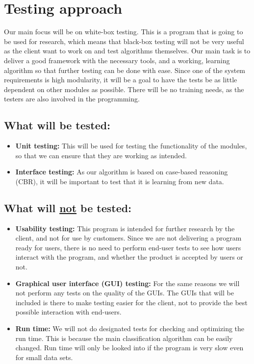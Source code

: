 \documentclass[12pt, fullpage, oneside]{report}
\begin{document}
	\section{Testing approach}
		Our main focus will be on white-box testing. This is a program that is going to be used for research, which means that black-box testing will not be very useful as the client want to work on and test algorithms themselves. Our main task is to deliver a good framework with the 				necessary tools, and a working, learning algorithm so that further testing can be done with ease. Since one of the system requirements is high modularity, it will be a goal to have the tests be as little dependent on other modules as possible. There will be no training needs, as the 				testers are also involved in the programming.

		\subsection*{What will be tested:}
			\begin{itemize}
				\renewcommand{\labelitemi}{$\bullet$}
					\item \textbf{Unit testing:} This will be used for testing the functionality of the modules, so that we can ensure that they are working as intended.
					\item \textbf{Interface testing:} As our algorithm is based on case-based reasoning (CBR), it will be important to test that it is learning from new data.
			\end{itemize}

		\subsection*{What will \underline{not} be tested:}
			\begin{itemize}
				\renewcommand{\labelitemi}{$\bullet$}
					\item \textbf{Usability testing:} This program is intended for further research by the client, and not for use by customers. Since we are not delivering a program ready for users, there is no need to perform end-user tests to see how users interact with the 							program, and whether the product is accepted by users or not.
					\item \textbf{Graphical user interface (GUI) testing:} For the same reasons we will not perform any tests on the quality of the GUIs. The GUIs that will be included is there to make testing easier for the client, not to provide the best possible interaction with end-users.
					\item \textbf{Run time:} We will not do designated tests for checking and optimizing the run time. This is because the main classification algorithm can be easily changed. Run time will only be looked into if the program is very slow even for small data sets.
			\end{itemize}
		
\end{document}

